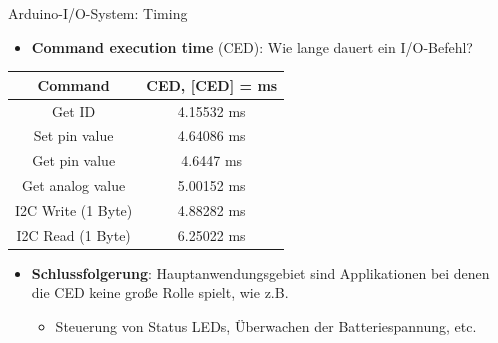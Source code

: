 \documentclass{beamer}
\begin{document}
\begin{frame}{Arduino-I/O-System: Timing}
	\begin{itemize}
		\item \textbf{Command execution time} (CED): Wie lange dauert ein I/O-Befehl?
	\end{itemize}
	\begin{table}[htbp]
		\begin{tabular}{|c|c|}
			\hline 
			\textbf{Command} & \textbf{CED, [CED] = ms} \\ 
			\hline \hline 
			Get ID & 4.15532 ms \\ 
			\hline 
			Set pin value & 4.64086 ms  \\ 
			\hline
			Get pin value & 4.6447 ms \\ 
			\hline
			Get analog value & 5.00152 ms \\ 
			\hline
			I2C Write (1 Byte)  & 4.88282 ms\\ 
			\hline
			I2C Read (1 Byte) & 6.25022 ms \\
			\hline
		\end{tabular}
	\end{table}
	\begin{itemize}
		\item \textbf{Schlussfolgerung}: Hauptanwendungsgebiet sind Applikationen bei denen die CED keine gro\ss{}e Rolle spielt, wie z.B.
		\begin{itemize}
			\item Steuerung von Status LEDs, \"Uberwachen der Batteriespannung, etc.
		\end{itemize}
	\end{itemize}
\end{frame}
\end{document}
